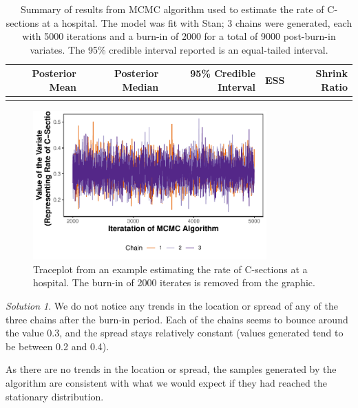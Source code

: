 \documentclass[
  letterpaper,
  DIV=11,
  numbers=noendperiod]{scrreprt}
\theoremstyle{definition}
\theoremstyle{definition}
\theoremstyle{plain}
\theoremstyle{remark}
\newtheorem*{solution}{Solution}
\begin{document}
\hypertarget{tbl-csec-mcmc}{}
\begin{table}
\caption{\label{tbl-csec-mcmc}Summary of results from MCMC algorithm used to estimate the rate of
C-sections at a hospital. The model was fit with Stan; 3 chains were
generated, each with 5000 iterations and a burn-in of 2000 for a total
of 9000 post-burn-in variates. The 95\% credible interval reported is an
equal-tailed interval. }\tabularnewline

\centering
\begin{tabular}[t]{rrrrr}
\toprule
Posterior Mean & Posterior Median & 95\% Credible Interval & ESS & Shrink Ratio\\
\midrule
\cellcolor{gray!6}{0.307} & \cellcolor{gray!6}{0.306} & \cellcolor{gray!6}{(0.224, 0.397)} & \cellcolor{gray!6}{3495.544} & \cellcolor{gray!6}{1.001}\\
\bottomrule
\end{tabular}
\end{table}

\begin{figure}

{\centering \includegraphics[width=0.8\textwidth,height=\textheight]{./images/fig-csec-traceplot-1.pdf}

}

\caption{\label{fig-csec-traceplot}Traceplot from an example estimating
the rate of C-sections at a hospital. The burn-in of 2000 iterates is
removed from the graphic.}

\end{figure}

\begin{solution}

We do not notice any trends in the location or spread of any of the
three chains after the burn-in period. Each of the chains seems to
bounce around the value 0.3, and the spread stays relatively constant
(values generated tend to be between 0.2 and 0.4).

As there are no trends in the location or spread, the samples generated
by the algorithm are consistent with what we would expect if they had
reached the stationary distribution.

\end{solution}
\end{document}
